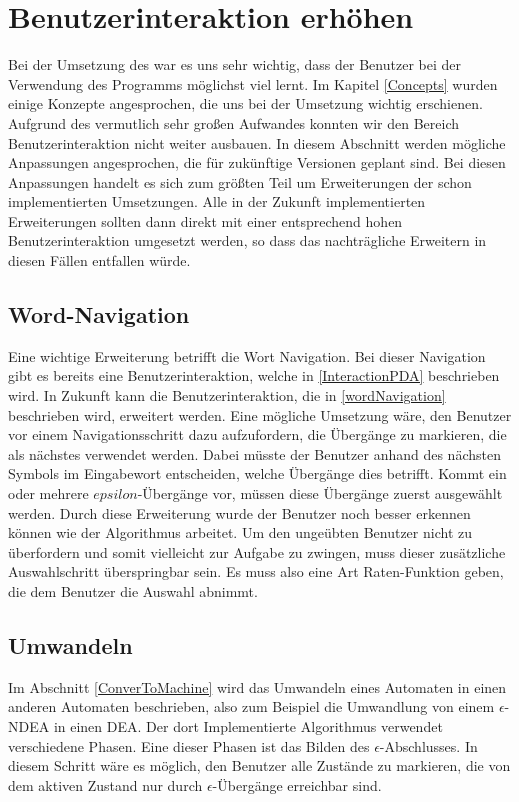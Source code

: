\section{Benutzerinteraktion erhöhen}

Bei der Umsetzung des \gtitools war es uns sehr wichtig, dass der Benutzer
bei der Verwendung des Programms möglichst viel lernt. Im Kapitel
\ref{Concepts} wurden einige Konzepte angesprochen, die uns bei der Umsetzung
wichtig erschienen. Aufgrund des vermutlich sehr großen Aufwandes konnten wir
den Bereich Benutzerinteraktion nicht weiter ausbauen. In diesem Abschnitt
werden mögliche Anpassungen angesprochen, die für zukünftige \gtitool Versionen
geplant sind. Bei diesen Anpassungen handelt es sich zum größten Teil um
Erweiterungen der schon implementierten Umsetzungen. Alle in der Zukunft
implementierten Erweiterungen sollten dann direkt mit einer entsprechend hohen
Benutzerinteraktion umgesetzt werden, so dass das nachträgliche Erweitern in
diesen Fällen entfallen würde.\vspace{10pt}


\subsection{Word-Navigation}
Eine wichtige Erweiterung betrifft die Wort Navigation. Bei dieser Navigation
gibt es bereits eine Benutzerinteraktion, welche in \ref{InteractionPDA}
beschrieben wird. In Zukunft kann die Benutzerinteraktion, die in
\ref{wordNavigation} beschrieben wird, erweitert werden. Eine mögliche Umsetzung
wäre, den Benutzer vor einem Navigationsschritt dazu aufzufordern, die Übergänge
zu markieren, die als nächstes verwendet werden. Dabei müsste der Benutzer anhand
des nächsten Symbols im Eingabewort entscheiden, welche Übergänge dies betrifft.
Kommt ein oder mehrere $epsilon$-Übergänge vor, müssen diese Übergänge zuerst
ausgewählt werden. Durch diese Erweiterung wurde der Benutzer noch besser
erkennen können wie der Algorithmus arbeitet. Um den ungeübten Benutzer nicht zu
überfordern und somit vielleicht zur Aufgabe zu zwingen, muss dieser zusätzliche
Auswahlschritt überspringbar sein. Es muss also eine Art Raten-Funktion geben,
die dem Benutzer die Auswahl abnimmt.\vspace{10pt}


\subsection{Umwandeln}
Im Abschnitt \ref{ConverToMachine} wird das Umwandeln eines Automaten in einen
anderen Automaten beschrieben, also zum Beispiel die Umwandlung von einem
$\epsilon$-NDEA in einen DEA. Der dort Implementierte Algorithmus verwendet
verschiedene Phasen. Eine dieser Phasen ist das Bilden des
$\epsilon$-Abschlusses. In diesem Schritt wäre es möglich, den Benutzer alle
Zustände zu markieren, die von dem aktiven Zustand nur durch
$\epsilon$-Übergänge erreichbar sind.\vspace{10pt}

